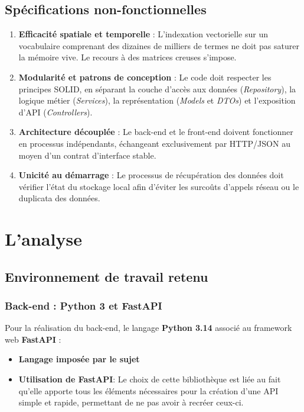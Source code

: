 \documentclass[12pt,a4paper]{article}
\begin{document}
\subsection{Spécifications non-fonctionnelles}

\begin{enumerate}
    \item \textbf{Efficacité spatiale et temporelle} : L'indexation vectorielle sur un vocabulaire comprenant des dizaines de milliers de termes ne doit pas saturer la mémoire vive. Le recours à des matrices creuses s'impose.
    \item \textbf{Modularité et patrons de conception} : Le code doit respecter les principes SOLID, en séparant la couche d'accès aux données (\textit{Repository}), la logique métier (\textit{Services}), la représentation (\textit{Models} et \textit{DTOs}) et l'exposition d'API (\textit{Controllers}).
    \item \textbf{Architecture découplée} : Le back-end et le front-end doivent fonctionner en processus indépendants, échangeant exclusivement par HTTP/JSON au moyen d'un contrat d'interface stable.
    \item \textbf{Unicité au démarrage} : Le processus de récupération des données doit vérifier l'état du stockage local afin d'éviter les surcoûts d'appels réseau ou le duplicata des données.
\end{enumerate}

\newpage

\section{L'analyse}

\subsection{Environnement de travail retenu}

\subsubsection{Back-end : Python 3 et FastAPI}

Pour la réalisation du back-end, le langage \textbf{Python 3.14} associé au framework web \textbf{FastAPI} :
\begin{itemize}
    \item \textbf{Langage imposée par le sujet}
    \item \textbf{Utilisation de FastAPI}: Le choix de cette bibliothèque est liée au fait qu'elle apporte tous les éléments nécessaires pour la création d'une API simple et rapide, permettant de ne pas avoir à recréer ceux-ci.
\end{itemize}
\end{document}
